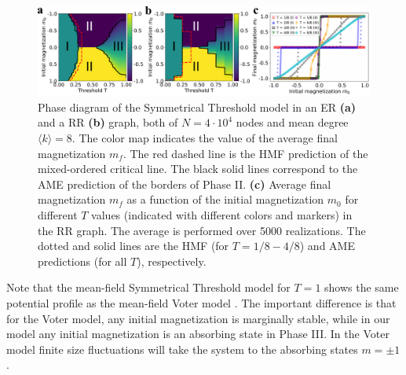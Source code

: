 \begin{figure}
	\centering \captionsetup{font=sf}
	\includegraphics[width=\linewidth]{Figs/Aging_STM/FIG2.pdf}
	\caption[Phase diagram in random networks]{\label{ER_REG_PD} Phase diagram of the Symmetrical Threshold model in an ER \textbf{(a)} and a RR \textbf{(b)} graph, both of $N=4\cdot10^4$ nodes and mean degree $\langle k \rangle=8$. The color map indicates the value of the average final magnetization $m_f$. The red dashed line is the HMF prediction of the mixed-ordered critical line. The black solid lines correspond to the AME prediction of the borders of Phase II. \textbf{(c)} Average final magnetization $m_f$ as a function of the initial magnetization $m_0$ for different $T$ values (indicated with different colors and markers) in the RR graph. The average is performed over 5000 realizations. The dotted and solid lines are the HMF (for $T=1/8 - 4/8$) and AME predictions (for all $T$), respectively.}
\end{figure}


Note that the mean-field Symmetrical Threshold model for $T=1$ shows the same potential profile as the mean-field Voter model \cite{Suchecki-2005, Voter-original, Voter}. The important difference is that for the Voter model, any initial magnetization is marginally stable, while in our model any initial magnetization is an absorbing state in Phase III. In the Voter model finite size fluctuations will take the system to the absorbing states $m=\pm 1$. 


